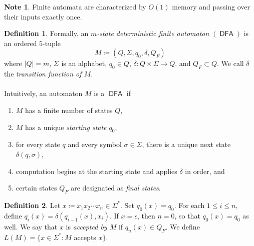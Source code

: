 \documentclass[10pt,letterpaper,cm]{nupset}
\theoremstyle{definition}
\newtheorem*{definition}{Definition}
\newtheorem{note}{Note}
\newcommand{\1}{\mathbf{1}}
\newcommand{\0}{\vec 0}
\DeclareMathOperator{\DFA}{\mathsf{DFA}}
\begin{document}
\begin{note}
Finite automata are characterized by $O(1)$ memory and passing over their inputs exactly once.
\end{note}
\begin{definition}
Formally, an \textit{$m$-state deterministic finite automaton $(\DFA)$}  is an ordered $5$-tuple $$M\coloneqq (Q, \Sigma, q_0, \delta, Q_F)  $$ where  $|Q| = m$, $\Sigma$ is an alphabet, $q_0\in Q$, $\delta : Q\times \Sigma \to Q$, and $Q_F\subset Q$. We call $\delta$ the \textit{transition function of $M$}.
\\ \\
Intuitively, an automaton $M$ is a $\DFA$ if
\begin{enumerate}[label=(\alph*)]
\item $M$ has a finite number of states $Q$,
\item $M$ has a unique \textit{starting state $q_0$},
\item for every state $q$ and every symbol $\sigma \in \Sigma$, there is a unique next state $\delta(q, \sigma)$,
\item computation begins at the starting state and applies $\delta$ in order, and
\item certain states $Q_F$ are designated as \textit{final states}.
\end{enumerate}
\end{definition}

\begin{definition}
Let $x\coloneqq x_1x_2\cdots x_n \in \Sigma^{\ast}$. Set $q_0(x) = q_0$. For each $1\leq i\leq n$, define $q_i(x) =\delta(q_{i-1}(x), x_i)$. If $x= \epsilon$, then $n=0$, so that $q_0(x) = q_0$ as well. We say that $x$ is \textit{accepted by $M$} if $q_n(x) \in Q_F$. We define $L(M) =\{x\in \Sigma^{\ast} : M$ accepts $x\}$.
\end{definition}
\end{document}
